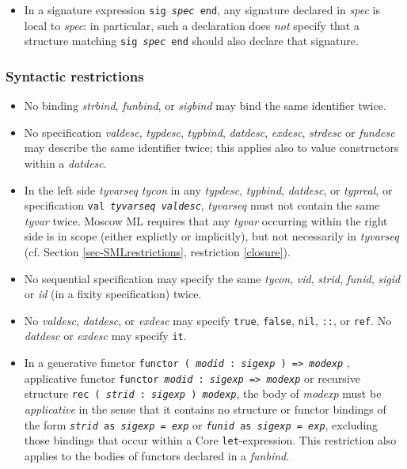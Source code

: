 \documentclass[fleqn]{article}
\begin{document}
\begin{itemize}
\item In a signature expression {\tt sig {\it spec\/} end}, any
signature declared in {\it spec\/} is local to {\it spec\/}: in particular,
such a declaration does \emph{not}
specify that a structure matching {\tt sig {\it spec\/} end} should
also declare that signature.
\end{itemize}

\subsubsection*{Syntactic restrictions}

\begin{itemize}
\item No binding {\it strbind\/}, {\it funbind\/}, or {\it sigbind \/} may bind
      the same identifier twice.

\item No specification {\it valdesc\/}, {\it typdesc\/}, {\it
    typbind\/}, {\it datdesc\/}, {\it exdesc\/}, {\it strdesc} or {\it fundesc} may describe the same identifier twice; this applies also to value constructors
  within a {\it datdesc\/}.

\item In the left side {\it tyvarseq tycon\/} in any {\it typdesc\/},
  {\it typbind\/}, {\it datdesc\/}, or {\it typreal},
  or specification {\tt val {\it tyvarseq valdesc}}, {\it tyvarseq\/} must not
  contain the same {\it tyvar\/} twice. 
  Moscow ML
  requires that   any {\it tyvar\/} occurring within the right side
  is in scope (either explictly or implicitly), but not necessarily in
  {\it tyvarseq} (cf. Section \ref{sec-SMLrestrictions}, restriction \ref{closure}).

 
\item No sequential specification 
  may specify the same {\it tycon}, {\it vid}, {\it strid}, {\it funid}, {\it  sigid} or {\it id} (in a fixity specification) twice.
  
\item No {\it valdesc}, {\it datdesc}, or {\it exdesc} may specify
  {\tt true}, {\tt false}, {\tt nil}, {\tt ::}, or {\tt ref}.  No {\it
    datdesc\/} or {\it exdesc} may specify {\tt it}.

\item In a generative functor {\tt functor ( {\it modid\/} :\ {\it sigexp} ) => {\it modexp}}
, applicative functor {\tt functor {\it modid\/} :\ {\it sigexp\/} => {\it modexp}} 
or recursive structure  {\tt rec ( {\it strid\/} :\ {\it sigexp} ) {\it modexp}},
the body of {\it modexp} must be {\it applicative} in the sense that it contains
no structure or functor bindings of the form 
{\tt {\it strid\/} as {\it sigexp} = {\it exp}} or
{\tt {\it funid\/} as {\it sigexp} = {\it exp}},
excluding those bindings that occur within a Core {\tt let}-expression.
This restriction also applies to the bodies of functors declared in a {\it funbind}.



\end{itemize}
\end{document}
